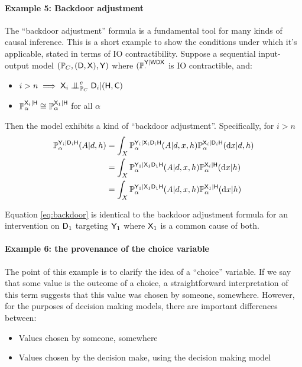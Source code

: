\paragraph{Example 5: Backdoor adjustment}

The ``backdoor adjustment'' formula is a fundamental tool for many kinds of causal inference. This is a short example to show the conditions under which it's applicable, stated in terms of IO contractibility. Suppose a sequential input-output model $(\mathbb{P}_C,(\mathsf{D},\mathsf{X}),\mathsf{Y})$ where $(\mathbb{P}_\cdot^{\mathsf{Y}|\mathsf{WDX}}$ is IO contractible, and:
\begin{itemize}
    \item $i>n\implies \RV{X}_{i}\CI^e_{\prob{P}_C}\RV{D}_{i}|(\RV{H},\RV{C})$
    \item $\mathbb{P}_\alpha^{\mathsf{X}_{i}|\mathsf{H}}\cong \mathbb{P}_\alpha^{\mathsf{X}_{1}|\mathsf{H}}$ for all $\alpha$
 \end{itemize}
Then the model exhibits a kind of ``backdoor adjustment''. Specifically, for $i>n$
\begin{align}
    \mathbb{P}_\alpha^{\mathsf{Y}_{i}|\mathsf{D}_{i}\mathsf{H}}(A|d,h) &= \int_X \mathbb{P}_\alpha^{\mathsf{Y}_{i}|\mathsf{X}_{i}\mathsf{D}_{i}\mathsf{H}}(A|d,x,h)\mathbb{P}_\alpha^{\mathsf{X}_{i}|\mathsf{D}_{i}\mathsf{H}}(\mathrm{d}x|d,h)\\
    &= \int_X \mathbb{P}_\alpha^{\mathsf{Y}_{1}|\mathsf{X}_{1}\mathsf{D}_{1}\mathsf{H}}(A|d,x,h)\mathbb{P}_\alpha^{\mathsf{X}_{i}|\mathsf{H}}(\mathrm{d}x|h)\\
    &= \int_X \mathbb{P}_\alpha^{\mathsf{Y}_{1}|\mathsf{X}_{1}\mathsf{D}_{1}\mathsf{H}}(A|d,x,h)\mathbb{P}_\alpha^{\mathsf{X}_{1}|\mathsf{H}}(\mathrm{d}x|h)\label{eq:backdoor}
\end{align}

Equation \eqref{eq:backdoor} is identical to the backdoor adjustment formula \citep[Chap. 1]{pearl_causality:_2009} for an intervention on $\mathsf{D}_1$ targeting $\mathsf{Y}_1$ where $\mathsf{X}_1$ is a common cause of both.

\paragraph{Example 6: the provenance of the choice variable}\label{sec:dm_control}


The point of this example is to clarify the idea of a ``choice'' variable. If we say that some value is the outcome of a choice, a straightforward interpretation of this term suggests that this value was chosen by someone, somewhere. However, for the purposes of decision making models, there are important differences between:
\begin{itemize}
    \item Values chosen by someone, somewhere
    \item Values chosen by the decision make, using the decision making model
\end{itemize}

